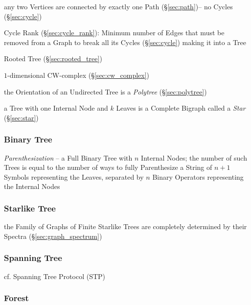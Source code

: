any two Vertices are connected by exactly one Path (\S\ref{sec:path})-- no
Cycles (\S\ref{sec:cycle})

Cycle Rank (\S\ref{sec:cycle_rank}): Minimum number of Edges that must be
removed from a Graph to break all its Cycles (\S\ref{sec:cycle}) making it into
a Tree

Rooted Tree (\S\ref{sec:rooted_tree})

$1$-dimensional CW-complex (\S\ref{sec:cw_complex})

the Orientation of an Undirected Tree is a \emph{Polytree}
(\S\ref{sec:polytree})

a Tree with one Internal Node and $k$ Leaves is a Complete Bigraph called a
\emph{Star} (\S\ref{sec:star})



\subsubsection{Binary Tree}\label{sec:binary_tree}

\emph{Parenthesization} -- a Full Binary Tree with $n$ Internal Nodes; the
number of such Trees is equal to the number of ways to fully Parenthesize a
String of $n+1$ Symbols representing the Leaves, separated by $n$ Binary
Operators representing the Internal Nodes



\subsubsection{Starlike Tree}\label{sec:starlike_tree}

the Family of Graphs of Finite Starlike Trees are completely determined by
their Spectra (\S\ref{sec:graph_spectrum})



\subsubsection{Spanning Tree}\label{sec:spanning_tree}

cf. Spanning Tree Protocol (STP)



\subsubsection{Forest}\label{sec:forest}



